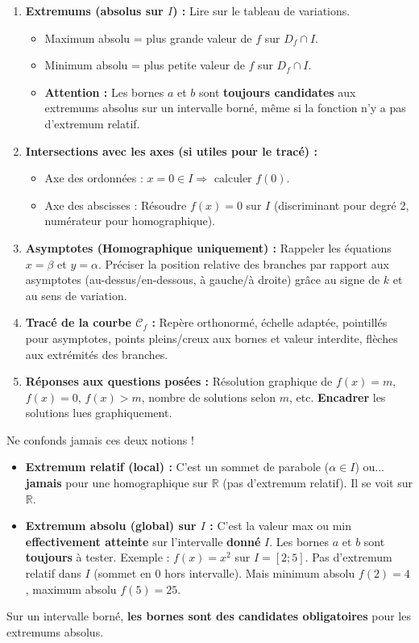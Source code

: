 \documentclass[11pt]{article}
\begin{document}
\begin{methode}[{Algorithme d'étude complète d'une fonction sur $I=[a;b]$}]
\begin{enumerate}
    \item \textbf{Extremums (absolus sur $I$) :} Lire sur le tableau de variations.
    \begin{itemize}
        \item Maximum absolu = plus grande valeur de $f$ sur $D_f \cap I$.
        \item Minimum absolu = plus petite valeur de $f$ sur $D_f \cap I$.
        \item \textbf{Attention :} Les bornes $a$ et $b$ sont \textbf{toujours candidates} aux extremums absolus sur un intervalle borné, même si la fonction n'y a pas d'extremum relatif.
    \end{itemize}
    \item \textbf{Intersections avec les axes (si utiles pour le tracé) :}
    \begin{itemize}
        \item Axe des ordonnées : $x=0 \in I \Rightarrow$ calculer $f(0)$.
        \item Axe des abscisses : Résoudre $f(x)=0$ sur $I$ (discriminant pour degré 2, numérateur pour homographique).
    \end{itemize}
    \item \textbf{Asymptotes (Homographique uniquement) :} Rappeler les équations $x=\beta$ et $y=\alpha$. Préciser la position relative des branches par rapport aux asymptotes (au-dessus/en-dessous, à gauche/à droite) grâce au signe de $k$ et au sens de variation.
    \item \textbf{Tracé de la courbe $\mathcal{C}_f$ :} Repère orthonormé, échelle adaptée, pointillés pour asymptotes, points pleins/creux aux bornes et valeur interdite, flèches aux extrémités des branches.
    \item \textbf{Réponses aux questions posées :} Résolution graphique de $f(x)=m$, $f(x)=0$, $f(x) > m$, nombre de solutions selon $m$, etc. \textbf{Encadrer} les solutions lues graphiquement.
\end{enumerate}
\end{methode}

\begin{attention}
Ne confonds jamais ces deux notions !
\begin{itemize}
    \item \textbf{Extremum relatif (local) :} C'est un sommet de parabole ($\alpha \in I$) ou... \textbf{jamais} pour une homographique sur $\mathbb{R}$ (pas d'extremum relatif). Il se voit sur $\mathbb{R}$.
    \item \textbf{Extremum absolu (global) sur $I$ :} C'est la valeur max ou min \textbf{effectivement atteinte} sur l'intervalle \textbf{donné} $I$. Les bornes $a$ et $b$ sont \textbf{toujours} à tester. Exemple : $f(x)=x^2$ sur $I=[2;5]$. Pas d'extremum relatif dans $I$ (sommet en 0 hors intervalle). Mais minimum absolu $f(2)=4$, maximum absolu $f(5)=25$.
\end{itemize}
Sur un intervalle borné, \textbf{les bornes sont des candidates obligatoires} pour les extremums absolus.
\end{attention}
\end{document}

